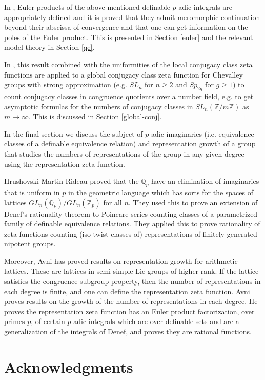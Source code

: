 \documentclass[12pt]{amsart}
\def\Z{\mathbb{Z}}
\def\Q{\mathbb{Q}}
\numberwithin{equation}{section}
\begin{document}
In \cite{zeta1}, Euler products of the above mentioned definable $p$-adic integrals are appropriately defined and it is proved that they admit meromorphic continuation beyond their abscissa of convergence and that one can get information on the poles of the Euler product. This is presented in Section \ref{euler} and the relevant model theory in Section \ref{qe}.

In \cite{zeta1}, this result combined with the uniformities of the local conjugacy class zeta functions are applied to a global conjugacy class zeta function for Chevalley groups with strong approximation (e.g. $SL_n$ for 
$n\geq 2$ and $Sp_{2g}$ for $g\geq 1$) to count conjugacy classes in congruence quotients over a number field, e.g. to get asymptotic formulas for the numbers of conjugacy classes in $SL_n(\Z/m\Z)$ as $m\rightarrow \infty$. This is discussed in Section \ref{global-conj}.

In the final section we discuss the subject of $p$-adic imaginaries (i.e. equivalence classes of a definable equivalence relation) and representation growth of a group that studies the 
numbers of representations of the group in any given degree using the representation zeta function. 

Hrushovski-Martin-Rideau \cite{HMR} proved that the $\Q_p$ have an elimination of imaginaries that is uniform in $p$ in 
the geometric language which has sorts for the spaces of lattices $GL_n(\Q_p)/GL_n(\Z_p)$ for all $n$. They used this 
to prove an extension of Denef's rationality theorem to Poincare series counting classes of a parametrized family of 
definable equivalence relations. They applied this to prove rationality of zeta functions counting (iso-twist classes of) representations of finitely generated nipotent groups. 

Moreover, Avni \cite{Nir} has proved results on representation growth for arithmetic lattices. These are lattices in semi-simple Lie groups of higher rank. If the lattice satisfies the congruence subgroup property, then the number of representations in each degree is finite, and one can define the representation zeta function. Avni proves results on the growth of the number of representations in each degree. He proves the representation zeta function has an Euler product factorization, over primes $p$, of certain 
$p$-adic integrals which are over definable sets and are a generalization of the integrals of Denef, and proves they are rational functions. 


\section{\bf Acknowledgments}
\end{document}
